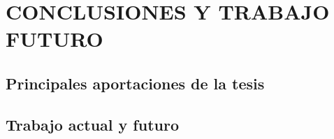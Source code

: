  
\chapter{CONCLUSIONES Y TRABAJO FUTURO}
		
	\section{Principales aportaciones de la tesis} 
		


	\section{Trabajo actual y futuro} 